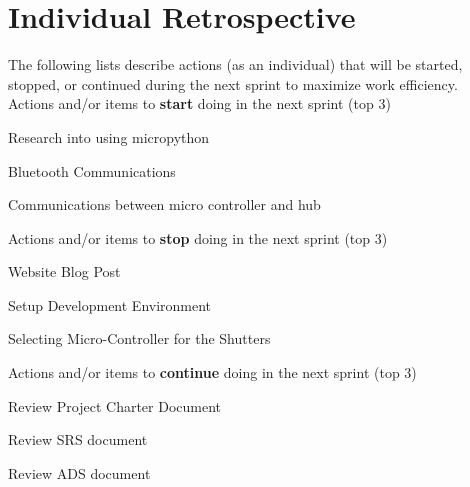 \documentclass{article}
\begin{document}
\pagebreak

\section{Individual Retrospective}
The following lists describe actions (as an individual) that will be started, stopped, or continued during the next sprint to maximize work efficiency. \\

Actions and/or items to \textbf{start} doing in the next sprint (top 3)
\begin{itemize}
\begin{item}
Research into using micropython
\end{item}
\begin{item}
Bluetooth Communications
\end{item}
\begin{item}
Communications between micro controller and hub
\end{item}
\end{itemize}

Actions and/or items to \textbf{stop} doing in the next sprint (top 3)
\begin{itemize}
\begin{item}
Website Blog Post
\end{item}
\begin{item}
Setup Development Environment
\end{item}
\begin{item}
Selecting Micro-Controller for the Shutters
\end{item}
\end{itemize}

Actions and/or items to \textbf{continue} doing in the next sprint (top 3)
\begin{itemize}
\begin{item}
Review Project Charter Document
\end{item}
\begin{item}
Review SRS document
\end{item}
\begin{item}
Review ADS document
\end{item}
\end{itemize}
\end{document}
